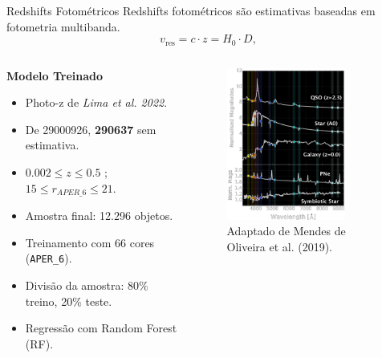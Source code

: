 \begin{frame}[c]{Redshifts Fotométricos}
    Redshifts fotométricos são estimativas baseadas em fotometria multibanda. 
    \begin{equation}
        v_\text{res} = c \cdot z = H_0 \cdot D,
    \end{equation}

    \begin{columns}
        \begin{column}{0.46\linewidth}
            \centering
            \footnotesize
            \textbf{Modelo Treinado}
            \begin{itemize}
                \item Photo-z de \textit{Lima et al. 2022}. 
                \item De 29000926, \textbf{290637} sem estimativa.
                \item $0.002 \leq z \leq 0.5$ ; $15 \leq r_{APER\_6} \leq 21$.
                \item Amostra final: 12.296 objetos.
                \item Treinamento com 66 cores (\texttt{APER\_6}).
                \item Divisão da amostra: 80\% treino, 20\% teste.
                \item Regressão com Random Forest (RF).
            \end{itemize}
        \end{column}
        \begin{column}{0.46\linewidth}
            \begin{figure}
                \centering
                \includegraphics[height=5cm]{script/images/splus_spectra_sed.png}
                \caption{Adaptado de Mendes de Oliveira et al. (2019).}
            \end{figure}
        \end{column}
    \end{columns}
\end{frame}

